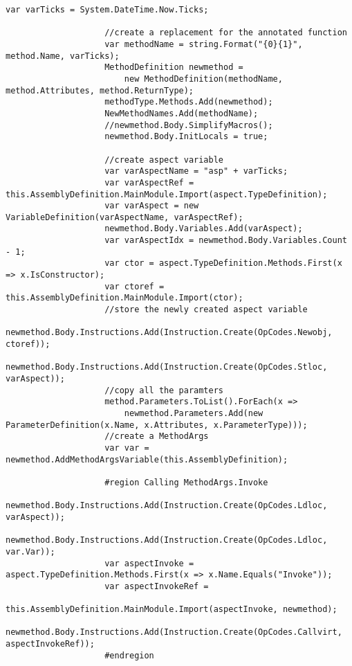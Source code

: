 \begin{lstlisting}[caption={../buffalo/Injectors/MethodAroundInjector.cs}, label=../buffalo/Injectors/MethodAroundInjector.cs, frame=tb, basicstyle=\scriptsize]
                    var varTicks = System.DateTime.Now.Ticks;

                    //create a replacement for the annotated function
                    var methodName = string.Format("{0}{1}", method.Name, varTicks);
                    MethodDefinition newmethod =
                        new MethodDefinition(methodName, method.Attributes, method.ReturnType);
                    methodType.Methods.Add(newmethod);
                    NewMethodNames.Add(methodName);
                    //newmethod.Body.SimplifyMacros();
                    newmethod.Body.InitLocals = true;

                    //create aspect variable
                    var varAspectName = "asp" + varTicks;
                    var varAspectRef = this.AssemblyDefinition.MainModule.Import(aspect.TypeDefinition);
                    var varAspect = new VariableDefinition(varAspectName, varAspectRef);
                    newmethod.Body.Variables.Add(varAspect);
                    var varAspectIdx = newmethod.Body.Variables.Count - 1;
                    var ctor = aspect.TypeDefinition.Methods.First(x => x.IsConstructor);
                    var ctoref = this.AssemblyDefinition.MainModule.Import(ctor);
                    //store the newly created aspect variable
                    newmethod.Body.Instructions.Add(Instruction.Create(OpCodes.Newobj, ctoref));
                    newmethod.Body.Instructions.Add(Instruction.Create(OpCodes.Stloc, varAspect));
                    //copy all the paramters
                    method.Parameters.ToList().ForEach(x =>
                        newmethod.Parameters.Add(new ParameterDefinition(x.Name, x.Attributes, x.ParameterType)));
                    //create a MethodArgs
                    var var = newmethod.AddMethodArgsVariable(this.AssemblyDefinition);

                    #region Calling MethodArgs.Invoke
                    newmethod.Body.Instructions.Add(Instruction.Create(OpCodes.Ldloc, varAspect));
                    newmethod.Body.Instructions.Add(Instruction.Create(OpCodes.Ldloc, var.Var));
                    var aspectInvoke = aspect.TypeDefinition.Methods.First(x => x.Name.Equals("Invoke"));
                    var aspectInvokeRef = 
                        this.AssemblyDefinition.MainModule.Import(aspectInvoke, newmethod);
                    newmethod.Body.Instructions.Add(Instruction.Create(OpCodes.Callvirt, aspectInvokeRef));
                    #endregion


\end{lstlisting}
